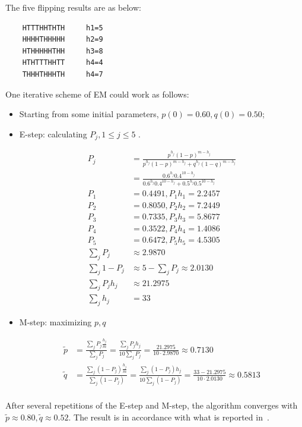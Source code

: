 \documentclass{article}  %
\begin{document}
The five flipping results are as below:

\begin{verbatim}
    HTTTHHTHTH     h1=5
    HHHHTHHHHH     h2=9
    HTHHHHHTHH     h3=8
    HTHTTTHHTT     h4=4
    THHHTHHHTH     h4=7
\end{verbatim}

One iterative scheme of EM could work as follows: 

\begin{itemize}

\item Starting from some initial parameters,  $ p (0) = 0.60, q (0) = 0.50$;

\item E-step: calculating $P_j, 1\leq j \leq 5$ . 

\begin{align*}
P_j &= \frac{ p ^ {h_j} (1- p)^{m-h_j}}{ p ^ {h_j} (1- p)^{m-h_j} +  q ^ {h_j}
(1- q)^{m-h_j} }\\
       &=  \frac{0.6 ^ {h_j} 0.4^{10-h_j}}{ 0.6 ^ {h_j} 0.4^{10-h_j} + 0.5 ^ {h_j} 0.5^{10-h_j} }\\
P_1 &= 0.4491, P_1h_1=2.2457\\
P_2 &= 0.8050, P_2h_2=7.2449\\
P_3 &= 0.7335, P_3h_3=5.8677\\
P_4 &= 0.3522, P_4h_4=1.4086\\
P_5 &= 0.6472, P_5h_5=4.5305\\
\sum_j P_j &\approx  2.9870\\
\sum_j 1-P_j &\approx  5-\sum_j P_j \approx 2.0130\\
\sum_j P_jh_j &\approx 21.2975\\
\sum_j h_j &= 33
\end{align*}

\item M-step: maximizing $p,q$

\begin{align*}
\tilde p &= \frac{\sum_j P_j\frac{h_j}{m}}{\sum_j P_j} = \frac{\sum_j P_j
h_j}{10 \sum_j P_j} = \frac{21.2975}{10 \cdot 2.9870}\approx 0.7130\\
\tilde q &= \frac{\sum_j (1-P_j)\frac{h_j}{m}}{\sum_j (1-P_j)}=\frac{\sum_j
(1-P_j)h_j}{10 \sum_j (1-P_j)}=\frac{33-21.2975}{10\cdot 2.0130}\approx 0.5813\\
\end{align*}
\end{itemize}

After several repetitions of the E-step and M-step, the algorithm converges with $\tilde p \approx 0.80, \tilde q  \approx 0.52$. The result is in accordance with what is reported in~\cite{nature}.
\end{document}
